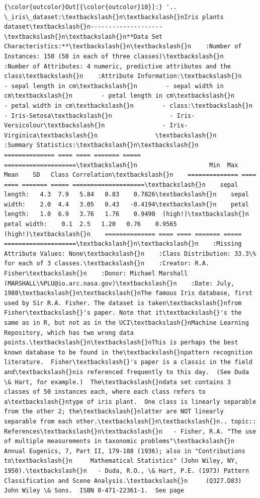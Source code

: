 \documentclass[11pt]{article}
\begin{document}
\begin{Verbatim}[commandchars=\\\{\}]
{\color{outcolor}Out[{\color{outcolor}10}]:} '.. \_iris\_dataset:\textbackslash{}n\textbackslash{}nIris plants dataset\textbackslash{}n--------------------\textbackslash{}n\textbackslash{}n**Data Set Characteristics:**\textbackslash{}n\textbackslash{}n    :Number of Instances: 150 (50 in each of three classes)\textbackslash{}n    :Number of Attributes: 4 numeric, predictive attributes and the class\textbackslash{}n    :Attribute Information:\textbackslash{}n        - sepal length in cm\textbackslash{}n        - sepal width in cm\textbackslash{}n        - petal length in cm\textbackslash{}n        - petal width in cm\textbackslash{}n        - class:\textbackslash{}n                - Iris-Setosa\textbackslash{}n                - Iris-Versicolour\textbackslash{}n                - Iris-Virginica\textbackslash{}n                \textbackslash{}n    :Summary Statistics:\textbackslash{}n\textbackslash{}n    ============== ==== ==== ======= ===== ====================\textbackslash{}n                    Min  Max   Mean    SD   Class Correlation\textbackslash{}n    ============== ==== ==== ======= ===== ====================\textbackslash{}n    sepal length:   4.3  7.9   5.84   0.83    0.7826\textbackslash{}n    sepal width:    2.0  4.4   3.05   0.43   -0.4194\textbackslash{}n    petal length:   1.0  6.9   3.76   1.76    0.9490  (high!)\textbackslash{}n    petal width:    0.1  2.5   1.20   0.76    0.9565  (high!)\textbackslash{}n    ============== ==== ==== ======= ===== ====================\textbackslash{}n\textbackslash{}n    :Missing Attribute Values: None\textbackslash{}n    :Class Distribution: 33.3\% for each of 3 classes.\textbackslash{}n    :Creator: R.A. Fisher\textbackslash{}n    :Donor: Michael Marshall (MARSHALL\%PLU@io.arc.nasa.gov)\textbackslash{}n    :Date: July, 1988\textbackslash{}n\textbackslash{}nThe famous Iris database, first used by Sir R.A. Fisher. The dataset is taken\textbackslash{}nfrom Fisher\textbackslash{}'s paper. Note that it\textbackslash{}'s the same as in R, but not as in the UCI\textbackslash{}nMachine Learning Repository, which has two wrong data points.\textbackslash{}n\textbackslash{}nThis is perhaps the best known database to be found in the\textbackslash{}npattern recognition literature.  Fisher\textbackslash{}'s paper is a classic in the field and\textbackslash{}nis referenced frequently to this day.  (See Duda \& Hart, for example.)  The\textbackslash{}ndata set contains 3 classes of 50 instances each, where each class refers to a\textbackslash{}ntype of iris plant.  One class is linearly separable from the other 2; the\textbackslash{}nlatter are NOT linearly separable from each other.\textbackslash{}n\textbackslash{}n.. topic:: References\textbackslash{}n\textbackslash{}n   - Fisher, R.A. "The use of multiple measurements in taxonomic problems"\textbackslash{}n     Annual Eugenics, 7, Part II, 179-188 (1936); also in "Contributions to\textbackslash{}n     Mathematical Statistics" (John Wiley, NY, 1950).\textbackslash{}n   - Duda, R.O., \& Hart, P.E. (1973) Pattern Classification and Scene Analysis.\textbackslash{}n     (Q327.D83) John Wiley \& Sons.  ISBN 0-471-22361-1.  See page 
\end{Verbatim}
\end{document}
